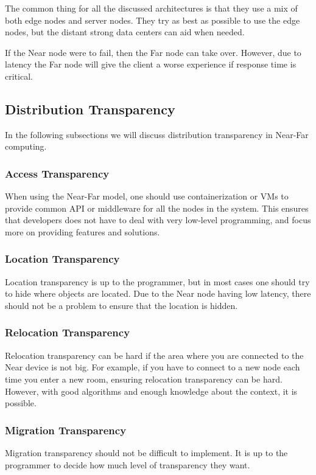 The common thing for all the discussed architectures is that they use a mix of both edge nodes and server nodes. They try as best as possible to use the edge nodes, but the distant strong data centers can aid when needed. 

If the Near node were to fail, then the Far node can take over. However, due to latency the Far node will give the client a worse experience if response time is critical. 

\subsection{Distribution Transparency}
In the following subsections we will discuss distribution transparency in Near-Far computing.

\subsubsection{Access Transparency}
When using the Near-Far model, one should use containerization or VMs to provide common API or middleware for all the nodes in the system. This ensures that developers does not have to deal with very low-level programming, and focus more on providing features and solutions.

\subsubsection{Location Transparency}
Location transparency is up to the programmer, but in most cases one should try to hide where objects are located. Due to the Near node having low latency, there should not be a problem to ensure that the location is hidden.

\subsubsection{Relocation Transparency}
Relocation transparency can be hard if the area where you are connected to the Near device is not big. For example, if you have to connect to a new node each time you enter a new room, ensuring relocation transparency can be hard. However, with good algorithms and enough knowledge about the context, it is possible. 

\subsubsection{Migration Transparency}
Migration transparency should not be difficult to implement. It is up to the programmer to decide how much level of transparency they want. 

